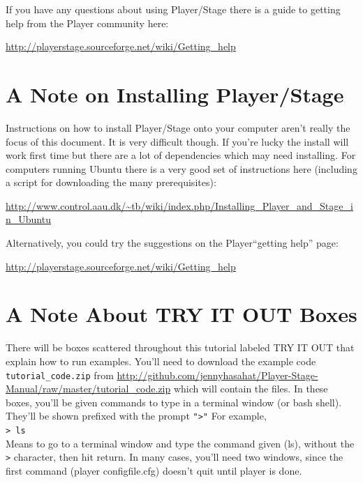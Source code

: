 \documentclass[a4paper]{report}
\newcommand{\plst}{Player/Stage\xspace}
\newcommand{\pl}{Player\xspace}
\begin{document}
If you have any questions about using \plst there is a guide to getting help from the \pl community here:
\begin{center}
	\url{http://playerstage.sourceforge.net/wiki/Getting_help}
\end{center}

\section{A Note on Installing \plst}
Instructions on how to install \plst onto your computer aren't really the focus of this document. It is very difficult though. If you're lucky the install will work first time but there are a lot of dependencies which may need installing. For computers running Ubuntu there is a very good set of instructions here (including a script for downloading the many prerequisites):
\begin{center}
\url{http://www.control.aau.dk/~tb/wiki/index.php/Installing_Player_and_Stage_in_Ubuntu}
\end{center}
Alternatively, you could try the suggestions on the \pl ``getting help'' page:
\begin{center}
	\url{http://playerstage.sourceforge.net/wiki/Getting_help}
\end{center}

\section{A Note About TRY IT OUT Boxes}
There will be boxes scattered throughout this tutorial labeled TRY IT OUT that explain how to run examples. You'll need to download the example code \texttt{tutorial\_code.zip} from \url{http://github.com/jennyhasahat/Player-Stage-Manual/raw/master/tutorial_code.zip} which will contain the files. 
In these boxes, you'll be given commands to type in a terminal window (or bash shell). They'll be shown prefixed with the prompt {\tt ">"} For
example, \\
{\tt > ls } \\
Means to go to a terminal window and type the command given (ls), without the {\tt >} character, then hit return.
In many cases, you'll need two windows, since the first command (player configfile.cfg) doesn't quit until player is done.  
\end{document}
